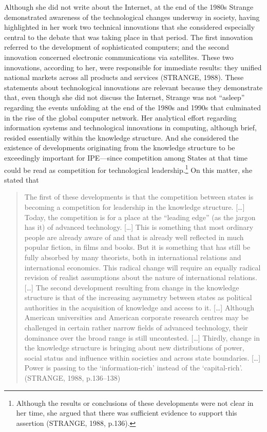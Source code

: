 Although she did not write about the Internet, at the end of the 1980s Strange demonstrated awareness of the technological changes underway in society, having highlighted in her work two technical innovations that she considered especially central to the debate that was taking place in that period. The first innovation referred to the development of sophisticated computers; and the second innovation concerned electronic communications via satellites. These two innovations, according to her, were responsible for immediate results: they unified national markets across all products and services (STRANGE, 1988). These statements about technological innovations are relevant because they demonstrate that, even though she did not discuss the Internet, Strange was not ``asleep'' regarding the events unfolding at the end of the 1980s and 1990s that culminated in the rise of the global computer network. Her analytical effort regarding information systems and technological innovations in computing, although brief, resided essentially within the knowledge structure. And she considered the existence of developments originating from the knowledge structure to be exceedingly important for IPE---since competition among States at that time could be read as competition for technological leadership.\footnote{Although the results or conclusions of these developments were not clear in her time, she argued that there was sufficient evidence to support this assertion (STRANGE, 1988, p.136).} On this matter, she stated that

\begin{quote}
The first of these developments is that the competition between states is becoming a competition for leadership in the knowledge structure. {[}\ldots{]} Today, the competition is for a place at the ``leading edge'' (as the jargon has it) of advanced technology. {[}\ldots{]} This is something that most ordinary people are already aware of and that is already well reflected in much popular fiction, in films and books. But it is something that has still be fully absorbed by many theorists, both in international relations and international economics. This radical change will require an equally radical revision of realist assumptions about the nature of international relations. {[}\ldots{]} The second development resulting from change in the knowledge structure is that of the increasing asymmetry between states as political authorities in the acquisition of knowledge and access to it. {[}\ldots{]} Although American universities and American corporate research centres may be challenged in certain rather narrow fields of advanced technology, their dominance over the broad range is still uncontested. {[}\ldots{]} Thirdly, change in the knowledge structure is bringing about new distributions of power, social status and influence within societies and across state boundaries. {[}\ldots{]} Power is passing to the `information-rich' instead of the `capital-rich'. (STRANGE, 1988, p.136--138)
\end{quote}

